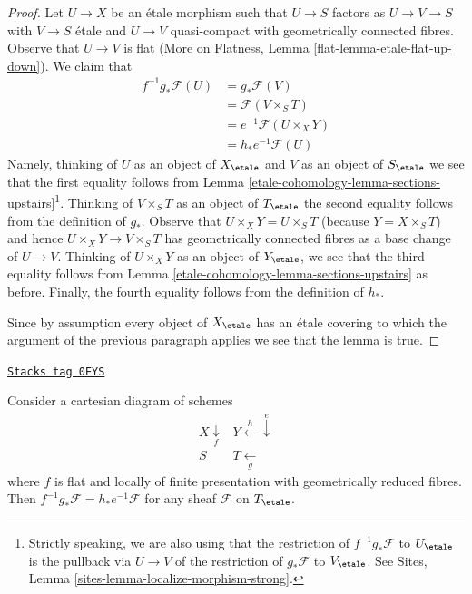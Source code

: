 \begin{proof}
Let $U \to X$ be an \'etale morphism such that $U \to S$ factors as
$U \to V \to S$ with $V \to S$ \'etale and $U \to V$ quasi-compact
with geometrically connected fibres. Observe that $U \to V$ is flat
(More on Flatness, Lemma \ref{flat-lemma-etale-flat-up-down}).
We claim that
\begin{align*}
f^{-1}g_*\mathcal{F}(U)
& = g_*\mathcal{F}(V) \\
& = \mathcal{F}(V \times_S T) \\
& = e^{-1}\mathcal{F}(U \times_X Y) \\
& = h_*e^{-1}\mathcal{F}(U)
\end{align*}
Namely, thinking of $U$ as an object of $X_\etale$ and
$V$ as an object of $S_\etale$ we see that the first equality
follows from Lemma \ref{etale-cohomology-lemma-sections-upstairs}\footnote{Strictly
speaking, we are also using that the restriction of $f^{-1}g_*\mathcal{F}$
to $U_\etale$ is the pullback via $U \to V$ of the restriction of
$g_*\mathcal{F}$ to $V_\etale$. See
Sites, Lemma \ref{sites-lemma-localize-morphism-strong}.}.
Thinking of $V \times_S T$ as an object of $T_\etale$
the second equality follows from the definition of $g_*$.
Observe that $U \times_X Y = U \times_S T$ (because $Y = X \times_S T$)
and hence $U \times_X Y \to V \times_S T$
has geometrically connected fibres as a base change of $U \to V$.
Thinking of $U \times_X Y$ as an object of $Y_\etale$, we see that
the third equality  follows from Lemma \ref{etale-cohomology-lemma-sections-upstairs}
as before. Finally, the fourth equality follows from the definition
of $h_*$.

\medskip\noindent
Since by assumption every object of $X_\etale$ has an \'etale
covering to which the argument of the previous paragraph applies
we see that the lemma is true.
\end{proof}

\begin{lemma}
\label{etale-cohomology-lemma-fppf-reduced-fibres-base-change-f-star}
\href{https://stacks.math.columbia.edu/tag/0EYS}{\texttt{Stacks tag 0EYS}}

Consider a cartesian diagram of schemes
$$
\begin{array}{cc}X \underset{f}{\downarrow} & Y \overset{h}{\longleftarrow}\overset{e}{\downarrow} \\ S & T \underset{g}{\longleftarrow}\end{array}
$$
where $f$ is flat and locally of finite presentation
with geometrically reduced fibres.
Then $f^{-1}g_*\mathcal{F} = h_*e^{-1}\mathcal{F}$
for any sheaf $\mathcal{F}$ on $T_\etale$.
\end{lemma}

